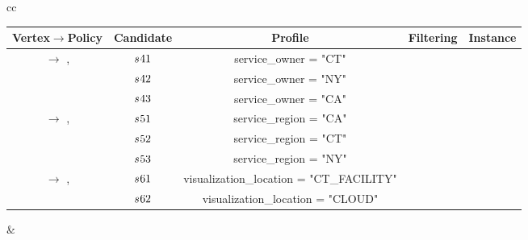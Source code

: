 \begin{example}[\bf \pipelineInstance]
\begin{table*}
{\begin{tabular}[t]{cc}
\begin{tabular}{c|c|c|c|c}
          \textbf{Vertex$\rightarrow$Policy}                   & \textbf{Candidate} & \textbf{Profile}                         & \textbf{Filtering} & \textbf{Instance} \\\hline
          \multirow{ 3}{*}{\vi{4}  $\rightarrow$ \p{1},\p{2} } & $s_{}{41}$           & service\_owner =    "CT"                 & \cmark             & \cmark            \\
                                                               & $s_{}{42}$           & service\_owner =    "NY"                 & \cmark             & \xmark            \\
                                                               & $s_{}{43}$           & service\_owner =    "CA"                 & \xmark             & \xmark            \\
          \hline
          \multirow{ 3}{*}{\vi{5}  $\rightarrow$ \p{5},\p{6} } & $s_{}{51}$           & service\_region =    "CA"                & \xmark             & \xmark            \\
                                                               & $s_{}{52}$           & service\_region =    "CT"                & \cmark             & \cmark            \\
                                                               & $s_{}{53}$           & service\_region =    "NY"                & \cmark             & \xmark            \\
          \hline
          \multirow{ 3}{*}{\vi{6}  $\rightarrow$ \p{7},\p{8} } & $s_{}{61}$           & visualization\_location = "CT\_FACILITY" & \cmark             & \cmark            \\
                                                               & $s_{}{62}$           & visualization\_location = "CLOUD"        & \cmark             & \xmark            \\
        \end{tabular}
         &

        \begin{tabular}{c|c}\label{tab:instance_example_maxquality}


\end{tabular}
\end{tabular}}
\end{table*}
\end{example}
